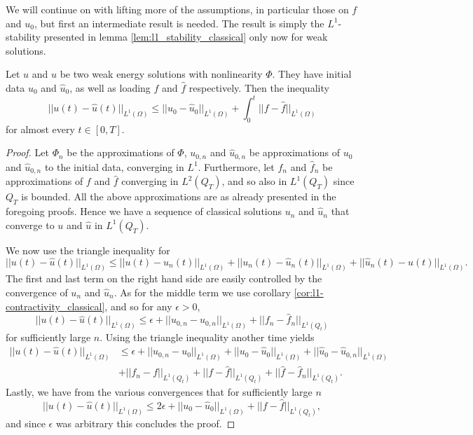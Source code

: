 \documentclass[11pt, a4paper]{article}
\begin{document}
We will continue on with lifting more of the assumptions, in particular those on $f$ and $u_0$, but first an intermediate result is needed. The result is simply the $L^1$-stability presented in lemma \ref{lem:l1_stability_classical} only now for weak solutions.

\begin{lemma}
\label{lem:l1_stability_weak}
Let $u$ and $\hat{u}$ be two weak energy solutions with nonlinearity $\Phi$. They have initial data $u_0$ and $\hat{u}_0$, as well as loading $f$ and $\hat{f}$ respectively. Then the inequality
\begin{equation}
||u(t) - \hat{u}(t)||_{L^1(\Omega)} \leq ||u_0 - \hat{u}_0||_{L^1(\Omega)} + \int_0^t||f-\hat{f}||_{L^1(\Omega)}
\end{equation}
for almost every $t\in [0,T]$.
\end{lemma}

\begin{proof}
Let $\Phi_n$ be the approximations of $\Phi$, $u_{0,n}$ and $\hat{u}_{0,n}$ be approximations of $u_0$ and $\hat{u}_{0,n}$ to the initial data, converging in $L^1$. Furthermore, let $f_n$ and $\hat{f}_n$ be approximations of $f$ and $\hat{f}$ converging in $L^2(Q_T)$, and so also in $L^1(Q_T)$ since $Q_T$ is bounded. All the above approximations are as already presented in the foregoing proofs. Hence we have a sequence of classical solutions $u_n$ and $\hat{u}_n$ that converge to $u$ and $\hat{u}$ in $L^1(Q_T)$.

We now use the triangle inequality for
\begin{equation*}
||u(t) - \hat{u}(t)||_{L^1(\Omega)} \leq ||u(t) - u_n(t)||_{L^1(\Omega)} + ||u_n(t) - \hat{u}_n(t)||_{L^1(\Omega)} + ||\hat{u}_n(t) - \hat{u}(t)||_{L^1(\Omega)}.
\end{equation*}
The first and last term on the right hand side are easily controlled by the convergence of $u_n$ and $\hat{u}_n$. As for the middle term we use corollary \ref{cor:l1-contractivity_classical}, and so for any $\epsilon > 0$,
\begin{equation*}
||u(t) - \hat{u}(t)||_{L^1(\Omega)} \leq \epsilon + ||u_{0,n} - \hat{u}_{0,n}||_{L^1(\Omega)} + ||f_n - \hat{f}_n||_{L^1(Q_t)}
\end{equation*}
for sufficiently large $n$.
Using the triangle inequality another time yields
\begin{align*}
||u(t) - \hat{u}(t)||_{L^1(\Omega)} &\leq \epsilon + ||u_{0,n} - u_0||_{L^1(\Omega)} + ||u_0 - \hat{u}_0||_{L^1(\Omega)} + ||\hat{u}_0 -\hat{u}_{0,n}||_{L^1(\Omega)} \\
&+ ||f_n - f||_{L^1(Q_t)} + ||f - \hat{f}||_{L^1(Q_t)} + ||\hat{f}-\hat{f}_n||_{L^1(Q_t)}.
\end{align*}
Lastly, we have from the various convergences that for sufficiently large $n$  
\begin{equation*}
||u(t) - \hat{u}(t)||_{L^1(\Omega)} \leq 2\epsilon + ||u_0 - \hat{u}_0||_{L^1(\Omega)} + ||f - \hat{f}||_{L^1(Q_t)}, 
\end{equation*}
and since $\epsilon$ was arbitrary this concludes the proof.
\end{proof}
\end{document}
